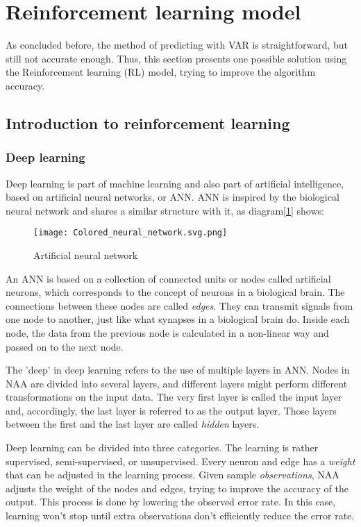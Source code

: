 \documentclass{mcmthesis}
\begin{document}
\lipsum[40]

\section{Reinforcement learning model}

As concluded before,
the method of predicting with VAR is straightforward,
but still not accurate enough.
Thus, this section presents one possible solution using the Reinforcement learning (RL) model,
trying to improve the algorithm accuracy.

\subsection{Introduction to reinforcement learning}

\subsubsection{Deep learning}

Deep learning is part of machine learning and also part of artificial intelligence,
based on artificial neural networks, or ANN.
ANN is inspired by the biological neural network
and shares a similar structure with it, as diagram[\ref{ANN}] shows:

\begin{figure}[h]
\small
\centering
\texttt{[image: Colored\_neural\_network.svg.png]}
\caption{Artificial neural network} \label{ANN}
\end{figure}

An ANN is based on a collection of connected units or nodes called artificial neurons,
which corresponds to the concept of neurons in a biological brain.
The connections between these nodes are called \textit{edges}.
They can transmit signals from one node to another,
just like what synapses in a biological brain do.
Inside each node, the data from the previous node is calculated in a non-linear way
and passed on to the next node.

The 'deep' in deep learning refers to the use of multiple layers in ANN.
Nodes in NAA are divided into several layers,
and different layers might perform different transformations on the input data.
The very first layer is called the input layer and,
accordingly, the last layer is referred to as the output layer.
Those layers between the first and the last layer are called \textit{hidden} layers.

Deep learning can be divided into three categories.
The learning is rather supervised, semi-supervised, or unsupervised.
Every neuron and edge has a \textit{weight} that can be adjusted in the learning process.
Given sample \textit{observations}, NAA adjusts the weight of the nodes and edges,
trying to improve the accuracy of the output.
This process is done by lowering the observed error rate.
In this case, learning won't stop until
extra observations don't efficiently reduce the error rate.
\end{document}
